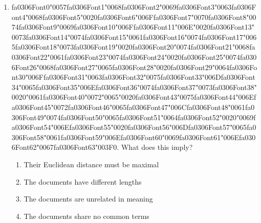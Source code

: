 \documentclass[12pt]{article}
\begin{document}
\begin{enumerate}[label=Q\arabic*.]
 \item {\csname fa0306Font0\endcsname\char"0057}{\csname fa0306Font1\endcsname\char"0068}{\csname fa0306Font2\endcsname\char"0069}{\csname fa0306Font3\endcsname\char"0063}{\csname fa0306Font4\endcsname\char"0068}{\csname fa0306Font5\endcsname\char"0020}{\csname fa0306Font6\endcsname\char"006F}{\csname fa0306Font7\endcsname\char"0070}{\csname fa0306Font8\endcsname\char"0074}{\csname fa0306Font9\endcsname\char"0069}{\csname fa0306Font10\endcsname\char"006F}{\csname fa0306Font11\endcsname\char"006E}{\char"0020}{\csname fa0306Font13\endcsname\char"0073}{\csname fa0306Font14\endcsname\char"0074}{\csname fa0306Font15\endcsname\char"0061}{\csname fa0306Font16\endcsname\char"0074}{\csname fa0306Font17\endcsname\char"0065}{\csname fa0306Font18\endcsname\char"0073}{\csname fa0306Font19\endcsname\char"0020}{\csname fa0306Font20\endcsname\char"0074}{\csname fa0306Font21\endcsname\char"0068}{\csname fa0306Font22\endcsname\char"0061}{\csname fa0306Font23\endcsname\char"0074}{\csname fa0306Font24\endcsname\char"0020}{\csname fa0306Font25\endcsname\char"0074}{\csname fa0306Font26\endcsname\char"0068}{\csname fa0306Font27\endcsname\char"0065}{\csname fa0306Font28\endcsname\char"0020}{\csname fa0306Font29\endcsname\char"0064}{\csname fa0306Font30\endcsname\char"006F}{\csname fa0306Font31\endcsname\char"0063}{\csname fa0306Font32\endcsname\char"0075}{\csname fa0306Font33\endcsname\char"006D}{\csname fa0306Font34\endcsname\char"0065}{\csname fa0306Font35\endcsname\char"006E}{\csname fa0306Font36\endcsname\char"0074}{\csname fa0306Font37\endcsname\char"0073}{\csname fa0306Font38\endcsname\char"0020}{\char"0061}{\csname fa0306Font40\endcsname\char"0072}{\char"0065}{\char"0020}{\csname fa0306Font43\endcsname\char"0075}{\csname fa0306Font44\endcsname\char"006E}{\csname fa0306Font45\endcsname\char"0072}{\csname fa0306Font46\endcsname\char"0065}{\csname fa0306Font47\endcsname\char"006C}{\csname fa0306Font48\endcsname\char"0061}{\csname fa0306Font49\endcsname\char"0074}{\csname fa0306Font50\endcsname\char"0065}{\csname fa0306Font51\endcsname\char"0064}{\csname fa0306Font52\endcsname\char"0020}{\char"0069}{\csname fa0306Font54\endcsname\char"006E}{\csname fa0306Font55\endcsname\char"0020}{\csname fa0306Font56\endcsname\char"006D}{\csname fa0306Font57\endcsname\char"0065}{\csname fa0306Font58\endcsname\char"0061}{\csname fa0306Font59\endcsname\char"006E}{\csname fa0306Font60\endcsname\char"0069}{\csname fa0306Font61\endcsname\char"006E}{\csname fa0306Font62\endcsname\char"0067}{\csname fa0306Font63\endcsname\char"003F}$0$. What does this imply?
 \begin{enumerate}[label=(\Alph*)]
     \item Their Euclidean distance must be maximal
     \item The documents have different lengths
     \item The documents are unrelated in meaning
     \item The documents share no common terms
 \end{enumerate}
 

\end{enumerate}
\end{document}
